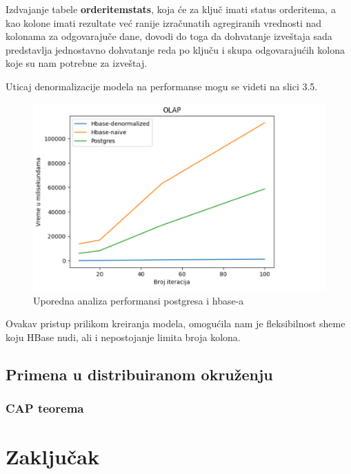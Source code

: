 \documentclass[12pt,oneside]{memoir}
\begin{document}
Izdvajanje tabele \textbf{orderitemstats}, koja će za ključ imati status orderitema, a kao kolone imati rezultate već ranije izračunatih agregiranih vrednosti nad kolonama za odgovarajuče dane, dovodi do toga da dohvatanje izveštaja sada predstavlja jednostavno dohvatanje reda po ključu i skupa odgovarajućih kolona koje su nam potrebne za izveštaj.

Uticaj denormalizacije modela na performanse mogu se videti na slici 3.5.

\begin{figure}[!ht]
  \centering
  \includegraphics[width=1\textwidth]{olap-vizualization.png}
  \caption{Uporedna analiza performansi postgresa i hbase-a}
  \label{fig:grafikon}
\end{figure}

Ovakav pristup prilikom kreiranja modela, omogućila nam je fleksibilnost sheme koju HBase nudi, ali i nepostojanje limita broja kolona. 

\pagebreak


\section{Primena u distribuiranom okruženju}
\subsection{CAP teorema}

\chapter{Zaključak}

\literatura
\end{document}

